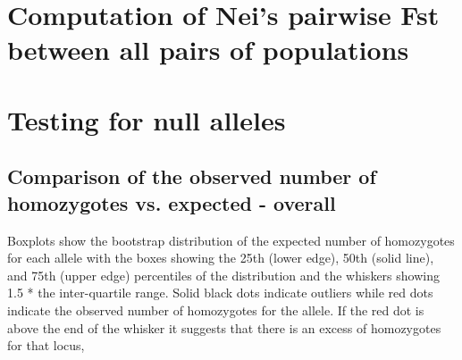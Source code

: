 \documentclass[a4paper]{scrartcl}\usepackage[]{graphicx}\usepackage[]{color}
\makeatletter
\newenvironment{kframe}{%
 \def\at@end@of@kframe{}%
 \ifinner\ifhmode%
  \def\at@end@of@kframe{\end{minipage}}%
  \begin{minipage}{\columnwidth}%
 \fi\fi%
 \def\FrameCommand##1{\hskip\@totalleftmargin \hskip-\fboxsep
 \colorbox{shadecolor}{##1}\hskip-\fboxsep
     \hskip-\linewidth \hskip-\@totalleftmargin \hskip\columnwidth}%
 \MakeFramed {\advance\hsize-\width
   \@totalleftmargin\z@ \linewidth\hsize
   \@setminipage}}%
 {\par\unskip\endMakeFramed%
 \at@end@of@kframe}
\newenvironment{knitrout}{}{} %
\makeatother
\begin{document}
\section{Computation of Nei's pairwise Fst between all pairs of populations}
\begin{knitrout}
\color{fgcolor}\begin{kframe}


{\ttfamily\noindent\bfseries{}}

{\ttfamily\noindent\bfseries\color{errorcolor}{\#\# Error in mat.fst[upper.tri(mat.fst)] <- NA: object 'mat.fst' not found}}

{\ttfamily\noindent\bfseries\color{errorcolor}{\#\# Error in is.data.frame(x): object 'mat.fst' not found}}

{\ttfamily\noindent\bfseries{}}\end{kframe}
\end{knitrout}



\begin{kframe}


{\ttfamily\noindent\bfseries\color{errorcolor}{\#\# Error in eval(expr, envir, enclos): object 'mat.fst' not found}}\end{kframe}

\begin{knitrout}
\color{fgcolor}\begin{kframe}


{\ttfamily\noindent\bfseries\color{errorcolor}{\#\# Error in eval(expr, envir, enclos): object 'mat.fst' not found}}\end{kframe}
\end{knitrout}


\FloatBarrier
\FloatBarrier

\section{Testing for null alleles}




\subsection{Comparison of the observed number of homozygotes vs. expected - overall}
Boxplots show the bootstrap distribution of the expected number of homozygotes for each allele with the boxes showing the 25th (lower edge), 50th (solid line), and 75th (upper edge) percentiles of the distribution and the whiskers showing 1.5 * the inter-quartile range. Solid black dots indicate outliers while red dots indicate the observed number of homozygotes for the allele. If the red dot is above the end of the whisker it suggests that there is an excess of homozygotes for that locus, 
\end{document}
